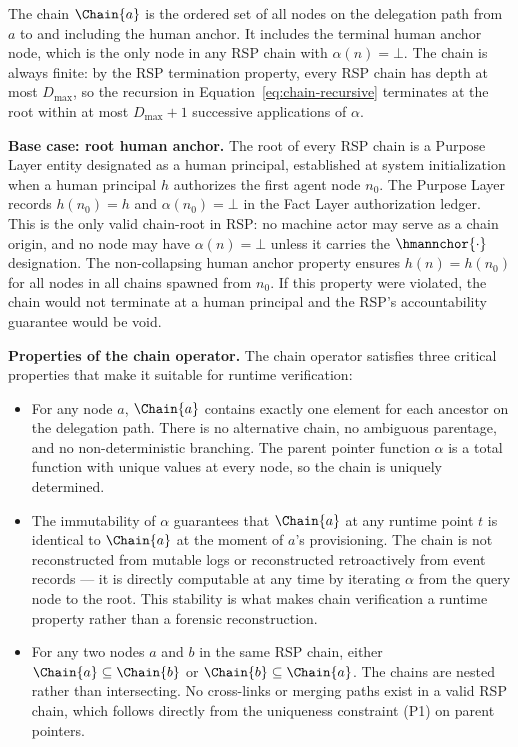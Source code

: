 The chain $\Chain{a}$ is the ordered set of all nodes on the delegation path from $a$ to and including the human anchor. It includes the terminal human anchor node, which is the only node in any RSP chain with $\alpha(n) = \bot$. The chain is always finite: by the RSP termination property, every RSP chain has depth at most $D_{\max}$, so the recursion in Equation~\ref{eq:chain-recursive} terminates at the root within at most $D_{\max} + 1$ successive applications of $\alpha$.

\bigskip
\noindent\textbf{Base case: root human anchor.} The root of every RSP chain is a Purpose Layer entity designated as a human principal, established at system initialization when a human principal $h$ authorizes the first agent node $n_0$. The Purpose Layer records $h(n_0) = h$ and $\alpha(n_0) = \bot$ in the Fact Layer authorization ledger. This is the only valid chain-root in RSP: no machine actor may serve as a chain origin, and no node may have $\alpha(n) = \bot$ unless it carries the $\hmannchor{\cdot}$ designation. The non-collapsing human anchor property ensures $h(n) = h(n_0)$ for all nodes in all chains spawned from $n_0$. If this property were violated, the chain would not terminate at a human principal and the RSP's accountability guarantee would be void.

\bigskip
\noindent\textbf{Properties of the chain operator.} The chain operator satisfies three critical properties that make it suitable for runtime verification:

\begin{itemize}
    \item[(C1) \textbf{Determinism}] For any node $a$, $\Chain{a}$ contains exactly one element for each ancestor on the delegation path. There is no alternative chain, no ambiguous parentage, and no non-deterministic branching. The parent pointer function $\alpha$ is a total function with unique values at every node, so the chain is uniquely determined.

    \item[(C2) \textbf{Stability}] The immutability of $\alpha$ guarantees that $\Chain{a}$ at any runtime point $t$ is identical to $\Chain{a}$ at the moment of $a$'s provisioning. The chain is not reconstructed from mutable logs or reconstructed retroactively from event records --- it is directly computable at any time by iterating $\alpha$ from the query node to the root. This stability is what makes chain verification a runtime property rather than a forensic reconstruction.

    \item[(C3) \textbf{Compositionality}] For any two nodes $a$ and $b$ in the same RSP chain, either $\Chain{a} \subseteq \Chain{b}$ or $\Chain{b} \subseteq \Chain{a}$. The chains are nested rather than intersecting. No cross-links or merging paths exist in a valid RSP chain, which follows directly from the uniqueness constraint (P1) on parent pointers.
\end{itemize}


